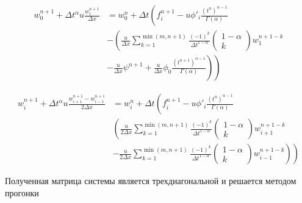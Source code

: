 
\begin{equation}
	\begin{split}
		w_0^{n+1} + \Delta t^{\alpha} u \frac{w_{1}^{n+1}}{\Delta x}
		&= w_0^{n} + \Delta t
		\left(
			f_i^{n+1} - u \phi'_{i}\frac{\left(t^n\right)^{\alpha - 1}}{\Gamma(\alpha)}
		\right.\\
		&\left. -
			\left(
				\frac{u}{\Delta x}
				\sum_{k=1}^{\min (m,n+1)}
				\frac{(-1)^k}{\Delta t^{1-\alpha}} \begin{pmatrix} 1 - \alpha \\ k \end{pmatrix}
				w^{n+1-k}_{1}
			\right.
		\right.\\
		&\left.
			\left.
				- \frac{u}{\Delta x}\psi^{n+1} + \frac{u}{\Delta x}\phi_0
				\frac{\left(t^{n+1}\right)^{\alpha - 1}}{\Gamma(\alpha)}
			\right)
		\right)
	\end{split}
\end{equation}

\begin{equation}
	\begin{split}
		w_i^{n+1} + \Delta t^{\alpha} u \frac{w_{i+1}^{n+1} - w_{i-1}^{n+1}}{2 \Delta x}
		&= w_i^{n} + \Delta t
		\left(
			f_i^{n+1} - u \phi'_{i}\frac{\left(t^n\right)^{\alpha - 1}}{\Gamma(\alpha)}
		\right.\\
		&\left.
			\left(
				\frac{u}{2 \Delta x}
				\sum_{k=1}^{\min (m,n+1)}
				\frac{(-1)^k}{\Delta t^{1-\alpha}}
				\begin{pmatrix} 1 - \alpha \\ k \end{pmatrix}
				w^{n+1-k}_{i+1}
			\right.
		\right.\\
		&\left.
			\left.
				- \frac{u}{2 \Delta x}
				\sum_{k=1}^{\min (m,n+1)}
				\frac{(-1)^k}{\Delta t^{1-\alpha}}
				\begin{pmatrix} 1 - \alpha \\ k \end{pmatrix}
				w^{n+1-k}_{i-1}
			\right)
		\right)
	\end{split}
\end{equation}
 
Полученная матрица системы является трехдиагональной и решается методом прогонки


